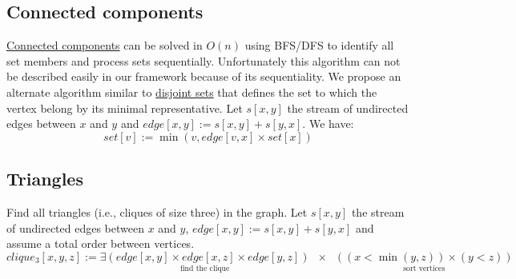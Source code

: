 \documentclass[11pt]{article}
\begin{document}
\subsection{Connected components}
\href{http://en.wikipedia.org/wiki/Connected_component_(graph_theory)}{Connected components} can be solved in $O(n)$ using BFS/DFS to identify all set members and process sets sequentially. Unfortunately this algorithm can not be described easily in our framework because of its sequentiality. We propose an alternate algorithm similar to \href{http://en.wikipedia.org/wiki/Disjoint-set_data_structure}{disjoint sets} that defines the set to which the vertex belong by its minimal representative. Let $s[x,y]$ the stream of undirected edges between $x$ and $y$ and $edge[x,y] := s[x,y]+s[y,x]$. We have:
\[set[v] := \min(v, edge[v,x] \times set[x])\]

\subsection{Triangles}
Find all triangles (i.e., cliques of size three) in the graph. Let $s[x,y]$ the stream of undirected edges between $x$ and $y$, $edge[x,y] := s[x,y]+s[y,x]$ and assume a total order between vertices.
\[clique_3[x,y,z] := \underset{\text{find the clique}}{\exists(edge[x,y] \times edge[x,z] \times edge[y,z])}
	\;\;\times\;\; \underset{\text{sort vertices}}{((x< \min(y,z)) \times (y < z))}\]

\end{document}
